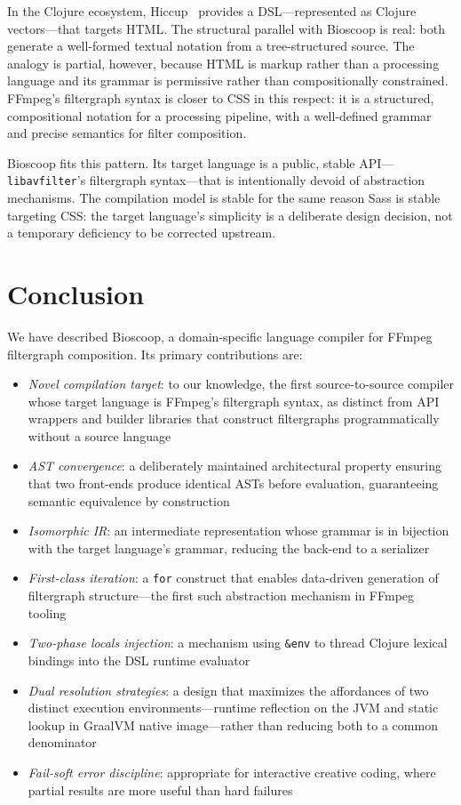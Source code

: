 \documentclass[english,submission]{programming}
\begin{document}
In the Clojure ecosystem, Hiccup~\cite{hiccup} provides a DSL---represented as Clojure vectors---that targets HTML. The structural parallel with Bioscoop is real: both generate a well-formed textual notation from a tree-structured source. The analogy is partial, however, because HTML is markup rather than a processing language and its grammar is permissive rather than compositionally constrained. FFmpeg's filtergraph syntax is closer to CSS in this respect: it is a structured, compositional notation for a processing pipeline, with a well-defined grammar and precise semantics for filter composition.

Bioscoop fits this pattern. Its target language is a public, stable API---\texttt{libavfilter}'s filtergraph syntax---that is intentionally devoid of abstraction mechanisms. The compilation model is stable for the same reason Sass is stable targeting CSS: the target language's simplicity is a deliberate design decision, not a temporary deficiency to be corrected upstream.

\section{Conclusion}

We have described Bioscoop, a domain-specific language compiler for FFmpeg filtergraph composition. Its primary contributions are:

\begin{itemize}
\item \emph{Novel compilation target}: to our knowledge, the first source-to-source compiler whose target language is FFmpeg's filtergraph syntax, as distinct from API wrappers and builder libraries that construct filtergraphs programmatically without a source language
\item \emph{AST convergence}: a deliberately maintained architectural property ensuring that two front-ends produce identical ASTs before evaluation, guaranteeing semantic equivalence by construction
\item \emph{Isomorphic IR}: an intermediate representation whose grammar is in bijection with the target language's grammar, reducing the back-end to a serializer
\item \emph{First-class iteration}: a \texttt{for} construct that enables data-driven generation of filtergraph structure---the first such abstraction mechanism in FFmpeg tooling
\item \emph{Two-phase locals injection}: a mechanism using \texttt{\&env} to thread Clojure lexical bindings into the DSL runtime evaluator
\item \emph{Dual resolution strategies}: a design that maximizes the affordances of two distinct execution environments---runtime reflection on the JVM and static lookup in GraalVM native image---rather than reducing both to a common denominator
\item \emph{Fail-soft error discipline}: appropriate for interactive creative coding, where partial results are more useful than hard failures
\end{itemize}
\end{document}
